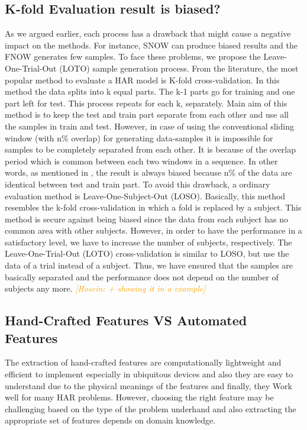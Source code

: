 \documentclass[journal,article,submit,moreauthors,pdftex]{Definitions/mdpi}
\newcommand{\hosein}[1]{\textcolor{orange}{{\it [Hosein: #1]}}}
\begin{document}
\subsection{K-fold Evaluation result is biased?}
As we argued earlier, each process has a drawback that might cause a negative impact on the methods. For instance, SNOW can produce biased results and the FNOW generates few samples. To face these problems, we propose the Leave-One-Trial-Out (LOTO) sample generation process.
From the literature, the most popular method to evaluate a HAR model is K-fold cross-validation. In this method the data splits into k equal parts. The k-1 parts go for training and one part left for test. This process repeats for each k, separately. Main aim of this method is to keep the test and train part separate from each other and use all the samples in train and test. However, in case of using the conventional sliding window (with n\% overlap) for generating data-samples it is impossible for samples to be completely separated from each other. It is because of the overlap period which is common between each two windows in a sequence. In other words, as mentioned in \cite{jordao2018human}, the result is always biased because n\% of the data are identical between test and train part. To avoid this drawback, a ordinary evaluation method is Leave-One-Subject-Out (LOSO). Basically, this method resembles the k-fold cross-validation in which a fold is replaced by a subject. This method is secure against being biased since the data from each subject has no common area with other subjects. However, in order to have the performance in a satisfactory level, we have to increase the number of subjects, respectively. The Leave-One-Trial-Out (LOTO) cross-validation\cite{jordao2018human} is similar to LOSO, but use the data of a trial instead of a subject. Thus, we have ensured that the samples are basically separated and the performance does not depend on the number of subjects any more.
\hosein{+ showing it in a example}

\subsection{Hand-Crafted Features VS Automated Features}

The extraction of hand-crafted features are computationally lightweight and efficient to implement especially in ubiquitous devices and also they are easy to understand due to the physical meanings of the features and finally, they Work well for many HAR problems. However, choosing the right feature may be challenging based on the type of the problem underhand and also extracting the appropriate set of features depends on domain knowledge.
\end{document}
